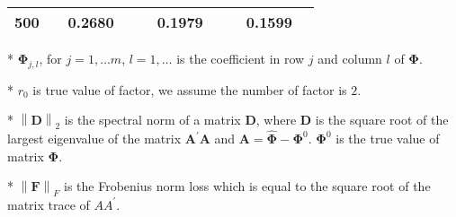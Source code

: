 \documentclass[12pt,a4paper,hyperref]{article}
\begin{document}
\begin{table}[H]
\begin{threeparttable}
\begin{tabular} {*{10}{c}}
500& & 0.2680& &  &0.1979 & & & 0.1599& \\
\bottomrule
\end{tabular}
\begin{tablenotes}
\footnotesize
  \item[*] $\boldsymbol{\Phi}_{j,l}$, for $j=1,\ldots m$, $l=1,\ldots$ is the coefficient in row $j$ and column $l$ of $\boldsymbol{\Phi}$.
\item[*] $r_{0}$ is true value of factor, we assume the number of factor is $2$.
 \item[*] $\left\| \boldsymbol{D} \right\|_{2}$ is the spectral norm of a matrix $\boldsymbol{D}$, where $\boldsymbol{D}$ is the square root of the largest eigenvalue of the matrix $\boldsymbol{A}^{'}\boldsymbol{A}$ and $\boldsymbol{A}=\hat{\boldsymbol{\Phi}}- \boldsymbol{\Phi}^{0}$. $\boldsymbol{\Phi}^{0}$ is the true value of matrix $\boldsymbol{\Phi}$.
 \item[*] $\left\| \boldsymbol{F} \right\|_{F} $ is the Frobenius norm loss which is equal to the square root of the matrix trace of $AA^{'}$.
    \end{tablenotes}
\end{threeparttable}
\end{table}
\end{document}
